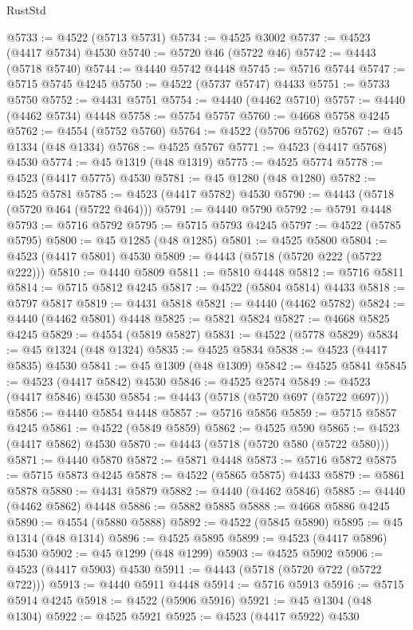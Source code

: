 \begin{lexlean}{RustStd}
\begin{coremodule}
@5733 := @4522 (@5713 @5731)
@5734 := @4525 @3002
@5737 := @4523 (@4417 @5734) @4530
@5740 := @5720 @46 (@5722 @46)
@5742 := @4443 (@5718 @5740)
@5744 := @4440 @5742 @4448
@5745 := @5716 @5744
@5747 := @5715 @5745 @4245
@5750 := @4522 (@5737 @5747) @4433
@5751 := @5733 @5750
@5752 := @4431 @5751
@5754 := @4440 (@4462 @5710)
@5757 := @4440 (@4462 @5734) @4448
@5758 := @5754 @5757
@5760 := @4668 @5758 @4245
@5762 := @4554 (@5752 @5760)
@5764 := @4522 (@5706 @5762)
@5767 := @45 @1334 (@48 @1334)
@5768 := @4525 @5767
@5771 := @4523 (@4417 @5768) @4530
@5774 := @45 @1319 (@48 @1319)
@5775 := @4525 @5774
@5778 := @4523 (@4417 @5775) @4530
@5781 := @45 @1280 (@48 @1280)
@5782 := @4525 @5781
@5785 := @4523 (@4417 @5782) @4530
@5790 := @4443 (@5718 (@5720 @464 (@5722 @464)))
@5791 := @4440 @5790
@5792 := @5791 @4448
@5793 := @5716 @5792
@5795 := @5715 @5793 @4245
@5797 := @4522 (@5785 @5795)
@5800 := @45 @1285 (@48 @1285)
@5801 := @4525 @5800
@5804 := @4523 (@4417 @5801) @4530
@5809 := @4443 (@5718 (@5720 @222 (@5722 @222)))
@5810 := @4440 @5809
@5811 := @5810 @4448
@5812 := @5716 @5811
@5814 := @5715 @5812 @4245
@5817 := @4522 (@5804 @5814) @4433
@5818 := @5797 @5817
@5819 := @4431 @5818
@5821 := @4440 (@4462 @5782)
@5824 := @4440 (@4462 @5801) @4448
@5825 := @5821 @5824
@5827 := @4668 @5825 @4245
@5829 := @4554 (@5819 @5827)
@5831 := @4522 (@5778 @5829)
@5834 := @45 @1324 (@48 @1324)
@5835 := @4525 @5834
@5838 := @4523 (@4417 @5835) @4530
@5841 := @45 @1309 (@48 @1309)
@5842 := @4525 @5841
@5845 := @4523 (@4417 @5842) @4530
@5846 := @4525 @2574
@5849 := @4523 (@4417 @5846) @4530
@5854 := @4443 (@5718 (@5720 @697 (@5722 @697)))
@5856 := @4440 @5854 @4448
@5857 := @5716 @5856
@5859 := @5715 @5857 @4245
@5861 := @4522 (@5849 @5859)
@5862 := @4525 @590
@5865 := @4523 (@4417 @5862) @4530
@5870 := @4443 (@5718 (@5720 @580 (@5722 @580)))
@5871 := @4440 @5870
@5872 := @5871 @4448
@5873 := @5716 @5872
@5875 := @5715 @5873 @4245
@5878 := @4522 (@5865 @5875) @4433
@5879 := @5861 @5878
@5880 := @4431 @5879
@5882 := @4440 (@4462 @5846)
@5885 := @4440 (@4462 @5862) @4448
@5886 := @5882 @5885
@5888 := @4668 @5886 @4245
@5890 := @4554 (@5880 @5888)
@5892 := @4522 (@5845 @5890)
@5895 := @45 @1314 (@48 @1314)
@5896 := @4525 @5895
@5899 := @4523 (@4417 @5896) @4530
@5902 := @45 @1299 (@48 @1299)
@5903 := @4525 @5902
@5906 := @4523 (@4417 @5903) @4530
@5911 := @4443 (@5718 (@5720 @722 (@5722 @722)))
@5913 := @4440 @5911 @4448
@5914 := @5716 @5913
@5916 := @5715 @5914 @4245
@5918 := @4522 (@5906 @5916)
@5921 := @45 @1304 (@48 @1304)
@5922 := @4525 @5921
@5925 := @4523 (@4417 @5922) @4530

\end{coremodule}
\end{lexlean}
